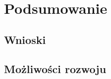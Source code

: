 \documentclass[eng,printmode,openany]{mgr}
\begin{document}
	\newpage
	\chapter{Podsumowanie}
	\section{Wnioski}
	\section{Możliwości rozwoju}
	
	
	
\end{document}
